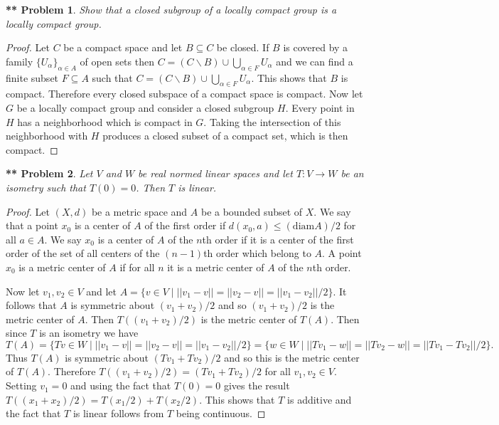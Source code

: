 \documentclass{article}
\newtheorem{**}{** Problem}
\begin{document}
\begin{flushleft}
\begin{**}
Show that a closed subgroup of a locally compact group is a locally compact group.
\end{**}
\begin{proof}
Let $C$ be a compact space and let $B \subseteq C$ be closed. If $B$ is covered by a family $\{U_{\alpha}\}_{\alpha \in A}$ of open sets then $C = (C \backslash B) \cup \bigcup_{\alpha \in F} U_{\alpha}$ and we can find a finite subset $F \subseteq A$ such that $C = (C \backslash B) \cup \bigcup_{\alpha \in F} U_{\alpha}$. This shows that $B$ is compact. Therefore every closed subspace of a compact space is compact. Now let $G$ be a locally compact group and consider a closed subgroup $H$. Every point in $H$ has a neighborhood which is compact in $G$. Taking the intersection of this neighborhood with $H$ produces a closed subset of a compact set, which is then compact.
\end{proof}

\begin{**}
Let $V$ and $W$ be real normed linear spaces and let $T : V \rightarrow W$ be an isometry such that $T(0) = 0$. Then $T$ is linear.
\end{**}
\begin{proof}
Let $(X,d)$ be a metric space and $A$ be a bounded subset of $X$. We say that a point $x_0$ is a center of $A$ of the first order if $d(x_0, a) \leq (\text{diam} A)/2$ for all $a \in A$. We say $x_0$ is a center of $A$ of the $n$th order if it is a center of the first order of the set of all centers of the $(n-1)$th order which belong to $A$. A point $x_0$ is a metric center of $A$ if for all $n$ it is a metric center of $A$ of the $n$th order.\newline

Now let $v_1, v_2 \in V$ and let $A = \{v \in V \mid ||v_1 - v|| = ||v_2 - v|| = ||v_1 - v_2||/2\}$. It follows that $A$ is symmetric about $(v_1 + v_2)/2$ and so $(v_1 + v_2)/2$ is the metric center of $A$. Then $T((v_1 + v_2)/2)$ is the metric center of $T(A)$. Then since $T$ is an isometry we have
\[
T(A) = \{Tv \in W \mid ||v_1 - v|| = ||v_2 - v|| = ||v_1 - v_2||/2\} = \{w \in W \mid ||Tv_1 - w|| = ||Tv_2 - w|| = ||Tv_1 - Tv_2||/2\}.
\]
Thus $T(A)$ is symmetric about $(Tv_1 + Tv_2)/2$ and so this is the metric center of $T(A)$. Therefore $T((v_1 + v_2)/2) = (Tv_1 + Tv_2)/2$ for all $v_1, v_2 \in V$. Setting $v_1 = 0$ and using the fact that $T(0) = 0$ gives the result $T((x_1 + x_2)/2) = T(x_1/2) + T(x_2/2)$. This shows that $T$ is additive and the fact that $T$ is linear follows from $T$ being continuous.
\end{proof}


\end{flushleft}
\end{document}
